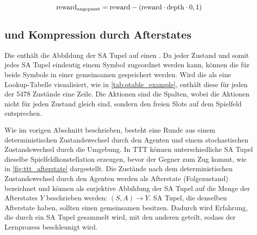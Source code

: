 \begin{equation}\label{eq:depth_penalty}\equationentry{Formel für korrigierten Reward mit Depth Penalty}
   \text{reward}_{\text{angepasst}}= \text{reward}- (\text{reward}\cdot \text{depth} \cdot 0,1)
\end{equation}



\subsection{\qtable und Kompression durch Afterstates}
\label{sec:afterstates}

Die \qtable enthält die Abbildung der \ac{SA Tupel} auf einen \qValue. 
Da jeder Zustand und somit jedes \ac{SA Tupel} eindeutig einem Symbol zugeordnet werden kann, können die \qValues für beide Symbole in einer gemeinsamen \qtable gespeichert werden. 
Wird die \qtable als eine Lookup-Tabelle visualisiert, wie in \cref{tab:qtable_example}, enthält diese für jeden der 5478 Zustände eine Zeile. 
Die Aktionen sind die Spalten, wobei die Aktionen nicht für jeden Zustand gleich sind, sondern den freien Slots auf dem Spielfeld entsprechen.



Wie im vorigen Abschnitt  beschrieben, besteht eine Runde aus einem deterministischen Zustandswechsel durch den Agenten und einem stochastischen Zustandswechsel durch die Umgebung.
In \acs{TTT} können unterschiedliche \ac{SA Tupel} dieselbe Spielfeldkonstellation erzeugen, bevor der Gegner zum Zug kommt, wie in \cref{fig:ttt_afterstate} dargestellt. 
Die Zustände nach dem deterministischen Zustandswechsel durch den Agenten werden als Afterstate (\dt Folgezustand) bezeichnet und können als surjektive Abbildung der \ac{SA Tupel} auf die Menge der Afterstates $Y$ beschrieben werden: $(S,A) \rightarrow Y$.  
\ac{SA Tupel}, die denselben Afterstate haben, sollten einen gemeinsamen \qValue besitzen. 
Dadurch wird Erfahrung, die durch ein \ac{SA Tupel} gesammelt wird, mit den anderen geteilt, sodass der Lernprozess beschleunigt wird. \cite[S. 136f.]{suttonReinforcementLearningIntroduction2018}

